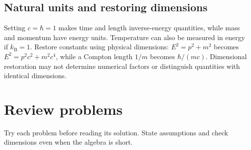 \documentclass[11pt,oneside]{book}
\newcommand{\kb}{k_{\mathrm B}}
\theoremstyle{reviewstyle}
\begin{document}
\section{Natural units and restoring dimensions}
Setting $c=\hbar=1$ makes time and length inverse-energy quantities, while mass and momentum have energy units. Temperature can also be measured in energy if $\kb=1$. Restore constants using physical dimensions: $E^2=p^2+m^2$ becomes $E^2=p^2c^2+m^2c^4$, while a Compton length $1/m$ becomes $\hbar/(mc)$. Dimensional restoration may not determine numerical factors or distinguish quantities with identical dimensions.

\chapter{Review problems}
Try each problem before reading its solution. State assumptions and check dimensions even when the algebra is short.
\end{document}
